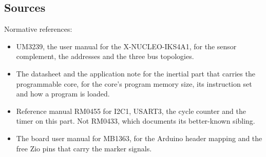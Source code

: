 \subsection*{Sources}

Normative references:
\begin{itemize}
\item UM3239, the user manual for the X-NUCLEO-IKS4A1, for the sensor
complement, the addresses and the three bus topologies.
\item The datasheet and the application note for the inertial part that carries
the programmable core, for the core's program memory size, its instruction set
and how a program is loaded.
\item Reference manual RM0455 for I2C1, USART3, the cycle counter and the timer
on this part. Not RM0433, which documents its better-known sibling.
\item The board user manual for MB1363, for the Arduino header mapping and the
free Zio pins that carry the marker signals.
\end{itemize}

